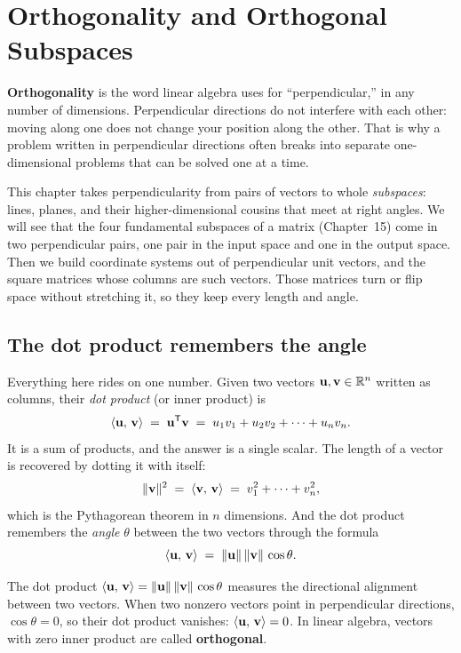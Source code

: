\chapter{Orthogonality and Orthogonal Subspaces}

\textbf{Orthogonality} is the word linear algebra uses for ``perpendicular,'' in any
number of dimensions. Perpendicular directions do not interfere with each other: moving
along one does not change your position along the other. That is why a problem
written in perpendicular directions often breaks into separate one-dimensional
problems that can be solved one at a time.

This chapter takes perpendicularity from pairs of vectors to whole \emph{subspaces}:
lines, planes, and their higher-dimensional cousins that meet at right angles. We will
see that the four fundamental subspaces of a matrix (Chapter~15) come in two
perpendicular pairs, one pair in the input space and one in the output space. Then we
build coordinate systems out of perpendicular unit vectors, and the square matrices
whose columns are such vectors. Those matrices turn or flip space without stretching
it, so they keep every length and angle.

\section{The dot product remembers the angle}

Everything here rides on one number. Given two vectors
$\mathbf{u},\mathbf{v}\in\mathbb{R}^n$ written as columns, their \emph{dot product} (or inner product) is
\[
  \langle \mathbf{u},\, \mathbf{v} \rangle \;=\; \mathbf{u}^{\mathsf{T}}\mathbf{v}
  \;=\; u_1 v_1 + u_2 v_2 + \cdots + u_n v_n.
\]
It is a sum of products, and the answer is a single scalar. The length of a vector is recovered
by dotting it with itself:
\[
  \lVert\mathbf{v}\rVert^2 \;=\; \langle \mathbf{v},\, \mathbf{v} \rangle \;=\; v_1^2 + \cdots + v_n^2,
\]
which is the Pythagorean theorem in $n$ dimensions. And the dot product remembers the
\emph{angle} $\theta$ between the two vectors through the formula
\[
  \langle \mathbf{u},\, \mathbf{v} \rangle \;=\; \lVert\mathbf{u}\rVert\,\lVert\mathbf{v}\rVert\,\cos\theta.
\]

\begin{intuitionbox}
The dot product $\langle \mathbf{u},\, \mathbf{v} \rangle = \lVert\mathbf{u}\rVert\,\lVert\mathbf{v}\rVert\,\cos\theta$
measures the directional alignment between two vectors. When two nonzero vectors point in
perpendicular directions, $\cos\theta = 0$, so their dot product vanishes:
$\langle \mathbf{u},\, \mathbf{v} \rangle = 0$. In linear algebra, vectors with zero inner product are called
\textbf{orthogonal}.
\end{intuitionbox}

